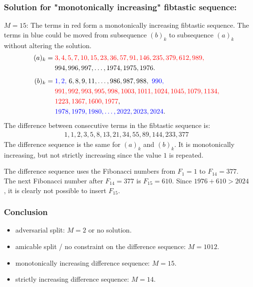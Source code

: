 \subsubsection*{Solution for "monotonically increasing" fibtastic sequence:}
$M=15$: The terms in red form a monotonically increasing fibtastic sequence. The terms in blue could be moved from subsequence $(b)_{k}$ to subsequence $(a)_{k}$ without altering the solution. 
\begin{align*}
(a)_{k} 
& = \textcolor{red}{3, 4, 5, 7, 10, 15, 23, 36, 57, 91, 146, 235, 379, 612, 989,}
\\ 
& \quad\
994, 996, 997, \ldots, 1974, 1975, 1976.
\\[1ex] 
(b)_{k} 
& = \textcolor{blue}{1, 2,} \
6, 8, 9, 11, \ldots, 986, 987, 988, \ 
\textcolor{blue}{990,} 
\\
& \quad\
\textcolor{red}{991, 992, 993, 995, 998, 1003, 1011, 1024, 1045, 1079, 1134,}
\\
& \quad\
\textcolor{red}{1223, 1367, 1600, 1977}, 
\\
& \quad\
\textcolor{blue}{1978, 1979, 1980, \ldots, 2022, 2023, 2024}.
\end{align*}
The difference between consecutive terms in the fibtastic sequence is:
\begin{align*}
1, 1, 2, 3, 5, 8, 13, 21, 34, 55, 89, 144, 233, 377
\end{align*}
The difference sequence is the same for $(a)_{k}$ and $(b)_{k}$. It is monotonically increasing, but not strictly increasing since the value $1$ is repeated. 

The difference sequence uses the Fibonacci numbers from $F_{1}=1$ to $F_{14}=377$. The next Fibonacci number after $F_{14}=377$ is $F_{15}=610$. Since $1976+610>2024$, it is clearly not possible to insert $F_{15}$. 

\subsubsection*{Conclusion}
\begin{itemize}[label=-,nosep]
\item adversarial split: $M=2$ or no solution.
\item amicable split / no constraint on the difference sequence: $M=1012$.
\item monotonically increasing difference sequence: $M=15$.
\item strictly increasing difference sequence: $M=14$.
\end{itemize}
